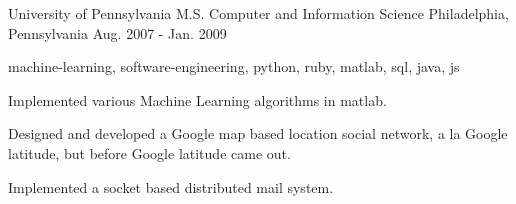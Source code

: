 \cventry
    {University of Pennsylvania} %
    {M.S. Computer and Information Science} %
    {Philadelphia, Pennsylvania} %
    {Aug. 2007 - Jan. 2009} %
    {
        \begin{cvitems} %
        \item {machine-learning, software-engineering, python, ruby, matlab, sql, java, js}
        \item {Implemented various Machine Learning algorithms in matlab.}
        \item {Designed and developed a Google map based location social network, a la Google latitude, but before Google latitude came out.
        }
        \item {Implemented a socket based distributed mail system.}
        \end{cvitems}
    }
